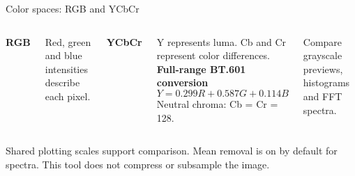 \documentclass[aspectratio=169,11pt]{beamer}
\newcommand{\topic}[1]{{\color{Teal}\bfseries #1}}
\newcommand{\muted}[1]{{\color{Muted}#1}}
\begin{document}
\begin{frame}{Color spaces: RGB and YCbCr}
\begin{columns}[T,onlytextwidth]
{\Large\bfseries\color{RedChannel}R\color{GreenChannel}G\color{BlueChannel}B}
\par\vspace{3mm} Red, green and blue intensities describe each pixel.
\par\vspace{6mm}
{\Large\topic{YCbCr}}
\par\vspace{3mm} Y represents luma. Cb and Cr represent color differences.
\topic{Full-range BT.601 conversion}
\vspace{3mm}
\[Y=0.299R+0.587G+0.114B\]
\muted{Neutral chroma: Cb = Cr = 128.}
\par\vspace{5mm} Compare grayscale previews, histograms and FFT spectra.
\end{columns}
\vspace{6mm}
\small\muted{Shared plotting scales support comparison. Mean removal is on by default for spectra. This tool does not compress or subsample the image.}
\end{frame}
\end{document}
